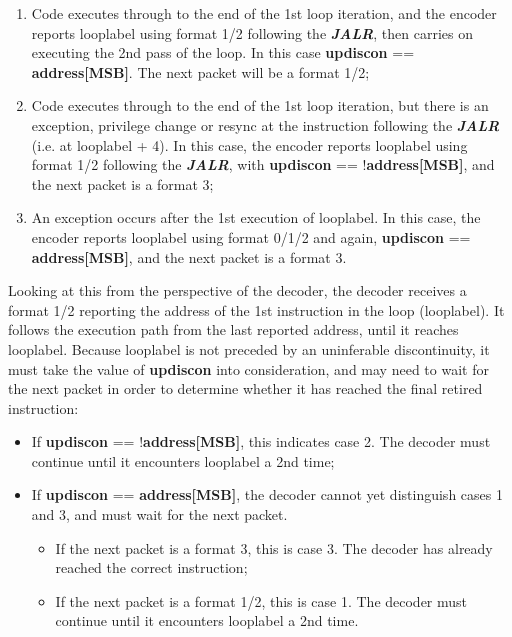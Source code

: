 \begin{enumerate}
  \item Code executes through to the end of the 1st loop iteration, and the encoder reports looplabel using format 1/2 following 
    the \textbf{\textit{JALR}}, then carries on executing the 2nd pass of the loop.  In this case \textbf{updiscon} == \textbf{address[MSB]}.  
    The next packet will be a format 1/2;
  \item Code executes through to the end of the 1st loop iteration, but there is an exception, privilege change or resync at
    the instruction following the \textbf{\textit{JALR}} (i.e. at looplabel + 4).  In this case, the encoder reports looplabel using 
    format 1/2 following the \textbf{\textit{JALR}}, with \textbf{updiscon} == !\textbf{address[MSB]}, and the next packet is a 
    format 3;
  \item An exception occurs after the 1st execution of looplabel.  In this case, the encoder reports looplabel using format 0/1/2 and again,
    \textbf{updiscon} == \textbf{address[MSB]}, and the next packet is a format 3.
\end{enumerate}

Looking at this from the perspective of the decoder, the decoder receives a format 1/2 reporting the address of the 1st instruction in the 
loop (looplabel).  It follows the execution path from the last reported address, until it reaches looplabel.  Because looplabel is not 
preceded by an uninferable discontinuity, it must take the value of \textbf{updiscon} into consideration, and may need to wait for the 
next packet in order to determine whether it has reached the final retired instruction:
\begin{itemize}  
  \item If \textbf{updiscon} == !\textbf{address[MSB]}, this indicates case 2.  The decoder must continue until it encounters 
    looplabel a 2nd time;
  \item If \textbf{updiscon} == \textbf{address[MSB]}, the decoder cannot yet distinguish cases 1 and 3, and must wait for the 
    next packet.
    \begin{itemize}
      \item If the next packet is a format 3, this is case 3.  The decoder has already reached the correct instruction;
      \item If the next packet is a format 1/2, this is case 1.  The decoder must continue until it encounters 
        looplabel a 2nd time.
    \end{itemize}
\end{itemize}

